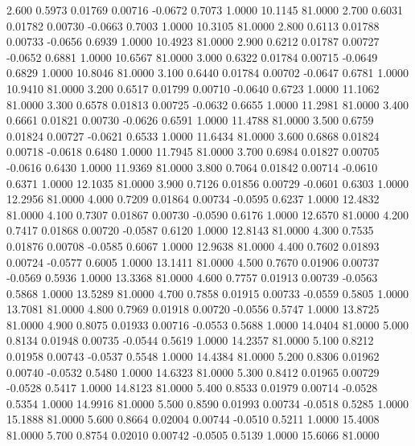    2.600   0.5973   0.01769   0.00716  -0.0672   0.7073   1.0000  10.1145  81.0000
   2.700   0.6031   0.01782   0.00730  -0.0663   0.7003   1.0000  10.3105  81.0000
   2.800   0.6113   0.01788   0.00733  -0.0656   0.6939   1.0000  10.4923  81.0000
   2.900   0.6212   0.01787   0.00727  -0.0652   0.6881   1.0000  10.6567  81.0000
   3.000   0.6322   0.01784   0.00715  -0.0649   0.6829   1.0000  10.8046  81.0000
   3.100   0.6440   0.01784   0.00702  -0.0647   0.6781   1.0000  10.9410  81.0000
   3.200   0.6517   0.01799   0.00710  -0.0640   0.6723   1.0000  11.1062  81.0000
   3.300   0.6578   0.01813   0.00725  -0.0632   0.6655   1.0000  11.2981  81.0000
   3.400   0.6661   0.01821   0.00730  -0.0626   0.6591   1.0000  11.4788  81.0000
   3.500   0.6759   0.01824   0.00727  -0.0621   0.6533   1.0000  11.6434  81.0000
   3.600   0.6868   0.01824   0.00718  -0.0618   0.6480   1.0000  11.7945  81.0000
   3.700   0.6984   0.01827   0.00705  -0.0616   0.6430   1.0000  11.9369  81.0000
   3.800   0.7064   0.01842   0.00714  -0.0610   0.6371   1.0000  12.1035  81.0000
   3.900   0.7126   0.01856   0.00729  -0.0601   0.6303   1.0000  12.2956  81.0000
   4.000   0.7209   0.01864   0.00734  -0.0595   0.6237   1.0000  12.4832  81.0000
   4.100   0.7307   0.01867   0.00730  -0.0590   0.6176   1.0000  12.6570  81.0000
   4.200   0.7417   0.01868   0.00720  -0.0587   0.6120   1.0000  12.8143  81.0000
   4.300   0.7535   0.01876   0.00708  -0.0585   0.6067   1.0000  12.9638  81.0000
   4.400   0.7602   0.01893   0.00724  -0.0577   0.6005   1.0000  13.1411  81.0000
   4.500   0.7670   0.01906   0.00737  -0.0569   0.5936   1.0000  13.3368  81.0000
   4.600   0.7757   0.01913   0.00739  -0.0563   0.5868   1.0000  13.5289  81.0000
   4.700   0.7858   0.01915   0.00733  -0.0559   0.5805   1.0000  13.7081  81.0000
   4.800   0.7969   0.01918   0.00720  -0.0556   0.5747   1.0000  13.8725  81.0000
   4.900   0.8075   0.01933   0.00716  -0.0553   0.5688   1.0000  14.0404  81.0000
   5.000   0.8134   0.01948   0.00735  -0.0544   0.5619   1.0000  14.2357  81.0000
   5.100   0.8212   0.01958   0.00743  -0.0537   0.5548   1.0000  14.4384  81.0000
   5.200   0.8306   0.01962   0.00740  -0.0532   0.5480   1.0000  14.6323  81.0000
   5.300   0.8412   0.01965   0.00729  -0.0528   0.5417   1.0000  14.8123  81.0000
   5.400   0.8533   0.01979   0.00714  -0.0528   0.5354   1.0000  14.9916  81.0000
   5.500   0.8590   0.01993   0.00734  -0.0518   0.5285   1.0000  15.1888  81.0000
   5.600   0.8664   0.02004   0.00744  -0.0510   0.5211   1.0000  15.4008  81.0000
   5.700   0.8754   0.02010   0.00742  -0.0505   0.5139   1.0000  15.6066  81.0000
